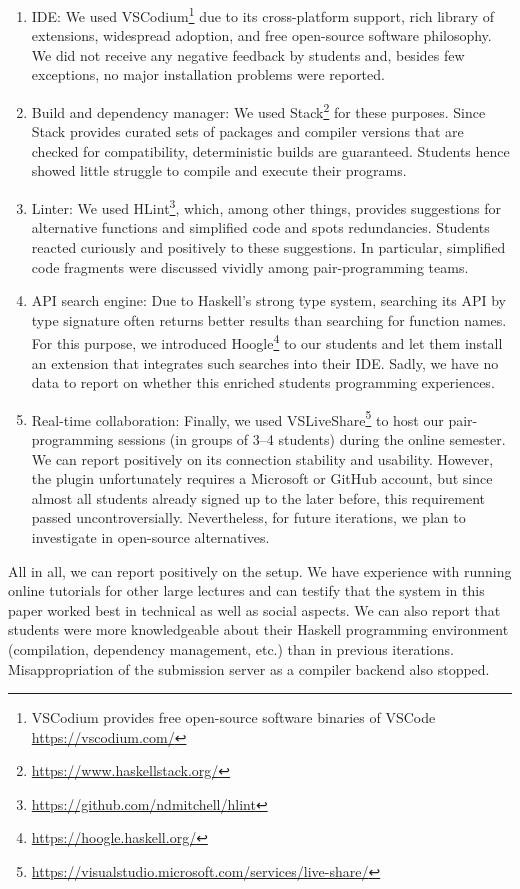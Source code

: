 \begin{enumerate}
  \item IDE: We used VSCodium\footnote{VSCodium provides free open-source software binaries of VSCode \url{https://vscodium.com/}} due to its cross-platform support,
    rich library of extensions,
    widespread adoption,
    and free open-source software philosophy.
    We did not receive any negative feedback by students
    and, besides few exceptions, no major installation problems were reported.
  \item Build and dependency manager: We used Stack\footnote{\url{https://www.haskellstack.org/}} for these purposes.
    Since Stack provides curated sets of packages and compiler versions that are checked for compatibility,
    deterministic builds are guaranteed.
    Students hence showed little struggle to compile and execute their programs.
  \item Linter: We used HLint\footnote{\url{https://github.com/ndmitchell/hlint}}, which, among other things,
    provides suggestions for alternative functions
    and simplified code and spots redundancies.
    Students reacted curiously and positively to these suggestions.
    In particular, simplified code fragments were
    discussed vividly among pair-programming teams.
  \item API search engine: Due to Haskell's strong type system,
    searching its API by type signature often returns better results than searching for function names.
    For this purpose, we introduced Hoogle\footnote{\url{https://hoogle.haskell.org/}} to our students and let them install an extension that integrates such searches into their IDE.
    Sadly, we have no data to report on whether this enriched students programming experiences.
  \item Real-time collaboration: Finally, we used VSLiveShare\footnote{\url{https://visualstudio.microsoft.com/services/live-share/}} to host our pair-programming sessions (in groups of 3--4 students) during the online semester.
    We can report positively on its connection stability and usability.
    However, the plugin unfortunately requires a Microsoft or GitHub account,
    but since almost all students
    already signed up to the later before,
    this requirement passed uncontroversially.
    Nevertheless, for future iterations,
    we plan to investigate in open-source alternatives.
\end{enumerate}
All in all, we can report positively on the setup.
We have experience with running online tutorials for other large lectures and can testify that
the system in this paper worked best in technical as well as social aspects.
We can also report that students were more knowledgeable
about their Haskell programming environment (compilation, dependency management, etc.) than in previous iterations.
Misappropriation of the submission server as a compiler backend also stopped.
